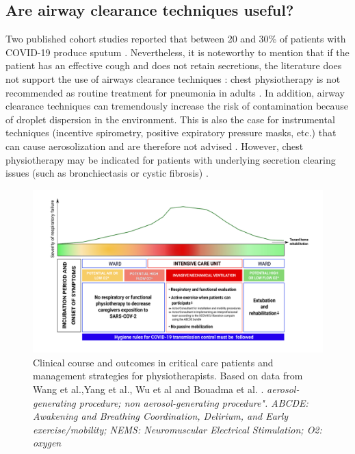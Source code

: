 \subsection{Are airway clearance techniques useful?}

Two published cohort studies reported that between 20 and 30\% of patients with COVID-19 produce sputum \cite{zhou_clinical_2020,guan_clinical_2020}. Nevertheless, it is noteworthy to mention that if the patient has an effective cough and does not retain secretions, the literature does not support the use of airways clearance techniques \cite{strickland_aarc_2013}: chest physiotherapy is not recommended as routine treatment for pneumonia in adults \cite{yang_chest_2013}. In addition, airway clearance techniques can tremendously increase the risk of contamination because of droplet dispersion in the environment. This is also the case for instrumental techniques (incentive spirometry, positive expiratory pressure masks, etc.) that can cause aerosolization and are therefore not advised \cite{simonds_evaluation_2010}. However, chest physiotherapy may be indicated for patients with underlying secretion clearing issues (such as bronchiectasis or cystic fibrosis) \cite{imam_non-cf_2020}.


\begin{figure}
\centering
\includegraphics[width=\linewidth]{review/figure-1.png}
\caption{Clinical course and outcomes in critical care patients and management strategies for physiotherapists. Based on data from Wang et al.,Yang et al., Wu et al and Bouadma et al. \cite{wu_characteristics_2020,wang_clinical_2020,alhazzani_surviving_2020,medrinal_icu_2020}. \textit{aerosol-generating procedure; non aerosol-generating procedure". ABCDE: Awakening and Breathing Coordination, Delirium, and Early exercise/mobility; NEMS: Neuromuscular Electrical Stimulation; O2: oxygen} 
}%
\end{figure}

